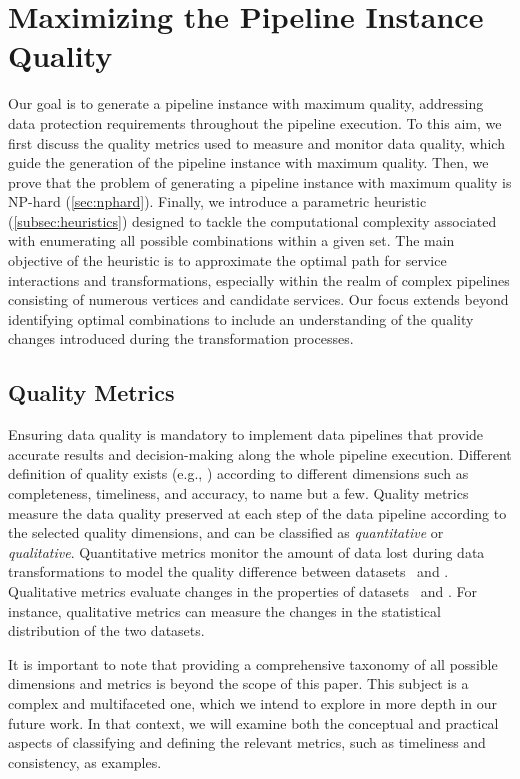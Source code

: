 \section{Maximizing the Pipeline Instance Quality}\label{sec:heuristics}
Our goal is to generate a pipeline instance with maximum quality, addressing data protection requirements throughout the pipeline execution. To this aim, we first discuss the quality metrics used to measure and monitor data quality, which guide the generation of the pipeline instance with maximum quality. Then, we prove that the problem of generating a pipeline instance with maximum quality is NP-hard (\cref{sec:nphard}). Finally, we introduce a parametric heuristic (\cref{subsec:heuristics}) designed to tackle the computational complexity associated with enumerating all possible combinations within a given set. The main objective of the heuristic is to approximate the optimal path for service interactions and transformations, especially within the realm of complex pipelines consisting of numerous vertices and candidate services. Our focus extends beyond identifying optimal combinations to include an understanding of the quality changes introduced during the transformation processes.

\subsection{Quality Metrics}\label{subsec:metrics}
Ensuring data quality is mandatory to implement data pipelines that provide accurate results and decision-making along the whole pipeline execution.
{\color{OurColor} Different definition of quality exists (e.g., \cite{Wang2023,surveyquality}) according to different dimensions such as completeness, timeliness, and accuracy, to name but a few. Quality metrics measure the data quality preserved at each step of the data pipeline according to the selected quality dimensions, and can be classified as \emph{quantitative} or \emph{qualitative}.}
Quantitative metrics monitor the amount of data lost during data transformations to model the quality difference between datasets \origdataset\ and \transdataset.
Qualitative metrics evaluate changes in the properties of datasets \origdataset\ and \transdataset. For instance, qualitative metrics can measure the changes in the statistical distribution of the two datasets.

{\color{OurColor2}
                  It is important to note that providing a comprehensive taxonomy of all possible dimensions and metrics is beyond the scope of this paper. This subject is a complex and multifaceted one, which we intend to explore in more depth in our future work. In that context, we will examine both the conceptual and practical aspects of classifying and defining the relevant metrics, such as timeliness and consistency, as examples.
                  }

